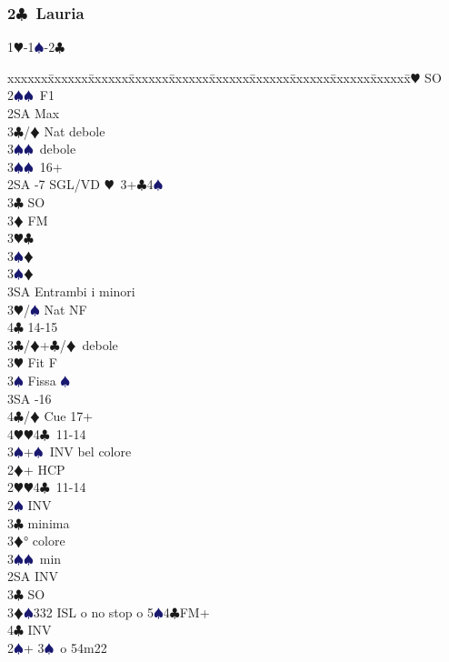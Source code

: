 \documentclass[a4paper,italian]{article}
\newcommand{\BC}{\textcolor{OliveGreen}{$\clubsuit$}}
\newcommand{\BD}{\textcolor{RedOrange}{$\vardiamondsuit$}}
\newcommand{\BH}{\textcolor{Red2}{$\varheartsuit${}}}
\newcommand{\BS}{\textcolor{MidnightBlue}{$\spadesuit${}}}
\newcommand{\pdfc}{\texorpdfstring{\BC{}}{C}}
\newenvironment{bidtable}
{\begin{tabbing}

    xxxxxx\=xxxxxx\=xxxxxx\=xxxxxx\=xxxxxx\=xxxxxx\=xxxxxx\=xxxxxx\=xxxxxx\=xxxxxx\=\kill}
{\end{tabbing} }%
\begin{document}
\begin{multicols*}{2}
    \subsubsection{2\pdfc\ Lauria} \label{lauria}

    1\BH-1\BS-2\BC
    \begin{bidtable}
        2\BH \> SO\+\\
        2\BS {}\BS\ F1\+\\
        2SA \> Max\\
        3\BC/\BD \> Nat debole\\
        3\BS {}\BS\ debole\-\\
        3\BS {}\BS\ 16+\-\\
        2SA -7 SGL/VD \BH\ 3+\BC 4\BS \+\\
        3\BC \> SO\\
        3\BD \> FM\+\\
        3\BH {}\BC \+\\
        3\BS {}\BD \-\\
        3\BS {}\BD \\
        3SA \> Entrambi i minori\-\\
        3\BH/\BS \> Nat NF\\
        4\BC {} 14-15\-\\
        3\BC/\BD {}+\BC /\BD\ debole\\
        3\BH \> Fit F\+\\
        3\BS \> Fissa \BS\\
        3SA -16\\
        4\BC/\BD \> Cue 17+\\
        4\BH {}\BH 4\BC\ 11-14\-\\
        3\BS {}+\BS\ INV bel colore\\
        2\BD {}+ HCP\+\\
        2\BH {}\BH 4\BC\ 11-14\+\\
        2\BS \> INV\+\\
        3\BC {} minima\\
        3\BD {}° colore\\
        3\BS {}\BS\ min\-\\
        2SA \> INV\\
        3\BC \> SO\\
        3\BD {}\BS 332 ISL o no stop o 5\BS 4\BC FM+\\
        4\BC \> INV\-\\
        2\BS {}+ 3\BS\ o 54m22\+\\

\end{bidtable}
\end{multicols*}
\end{document}
